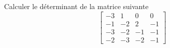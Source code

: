 Calculer le d\'eterminant de la matrice suivante
\[
\left[ 
\begin{array}{cccc}
-3 & 1 & 0 & 0\\
-1 & -2 & 2 & -1 \\
-3 & -2 & -1 & -1 \\
-2 & -3 & -2 & -1
\end{array}
\right]
\]